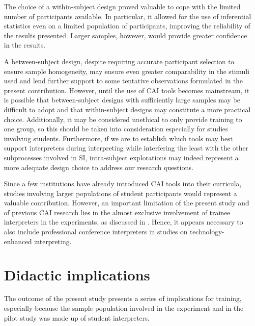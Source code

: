 The choice of a within-subject design proved valuable to cope with the limited number of participants available. In particular, it allowed for the use of inferential statistics even on a limited population of participants, improving the reliability of the results presented. Larger samples, however, would provide greater confidence in the results. 

A between-subject design, despite requiring accurate participant selection to ensure sample homogeneity, may ensure even greater comparability in the stimuli used and lend further support to some tentative observations formulated in the present contribution. However, until the use of CAI tools becomes mainstream, it is possible that between-subject designs with sufficiently large samples may be difficult to adopt and that within-subject designs may constitute a more practical choice. Additionally, it may be considered unethical to only provide training to one group, so this should be taken into consideration especially for studies involving students. Furthermore, if we are to establish which tools may best support interpreters during interpreting while interfering the least with the other subprocesses involved in SI, intra-subject explorations may indeed represent a more adequate design choice to address our research questions.

Since a few institutions have already introduced CAI tools into their curricula, studies involving larger populations of student participants would represent a valuable contribution. However, an important limitation of the present study and of previous CAI research lies in the almost exclusive involvement of trainee interpreters in the experiments, as discussed in . Hence, it appears necessary to also include professional conference interpreters in studies on technology-enhanced interpreting.

\section{Didactic implications} \label{implications_didactic}
The outcome of the present study presents a series of implications for training, especially because the sample population involved in the experiment and in the pilot study was made up of student interpreters.

